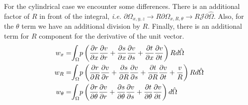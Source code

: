 \documentclass{kthreport}
\begin{document}
For the cylindrical case we encounter some differences. There is an additional factor of $R$ in front of the integral, \textit{i.e.} $\partial \Omega_{x,y,z} \rightarrow R\partial \Omega_{x,R,\theta} \rightarrow R\mathcal{J}\partial \hat{\Omega}$. Also, for the $\theta$ term we have an additional division by $R$. Finally, there is an additional term for $R$ component for the derivative of the unit vector.
\begin{eqnarray}
	w_{x} =& \mathlarger\int_{\Omega} p\left(\dfrac{\partial r}{\partial x}\dfrac{\partial v}{\partial r} + \dfrac{\partial s}{\partial x}\dfrac{\partial v}{\partial s} + \dfrac{\partial t}{\partial x}\dfrac{\partial v}{\partial t}\right) R d\hat{\Omega} \nonumber \\
	w_{R} =& \mathlarger\int_{\Omega} p\left(\dfrac{\partial r}{\partial R}\dfrac{\partial v}{\partial r} + \dfrac{\partial s}{\partial R}\dfrac{\partial v}{\partial s} + \dfrac{\partial t}{\partial R}\dfrac{\partial v}{\partial t} + \dfrac{v}{R} \right) R d\hat{\Omega} \nonumber \\
	w_{\theta} =& \mathlarger\int_{\Omega} p\left(\dfrac{\partial r}{\partial \theta}\dfrac{\partial v}{\partial r} + \dfrac{\partial s}{\partial \theta}\dfrac{\partial v}{\partial s} + \dfrac{\partial t}{\partial \theta}\dfrac{\partial v}{\partial t}\right) d\hat{\Omega} \nonumber
\end{eqnarray}
\end{document}
